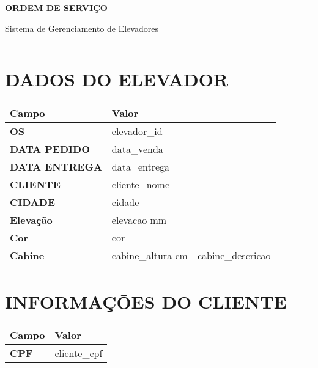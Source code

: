 \documentclass[a4paper,11pt]{article}
\begin{document}
\begin{center}
  {\Huge\textbf{ORDEM DE SERVIÇO}}
  
  \vspace{0.5cm}
  
  Sistema de Gerenciamento de Elevadores
\end{center}

\vspace{1cm}
\noindent\rule{\textwidth}{1pt}
\vspace{0.5cm}

\section*{DADOS DO ELEVADOR}

\begin{tabular}{|L{4cm}|L{8cm}|}
  \hline
  \textbf{Campo} & \textbf{Valor} \\
  \hline
  \textbf{OS} & {{elevador_id}} \\
  \hline
  \textbf{DATA PEDIDO} & {{data_venda}} \\
  \hline
  \textbf{DATA ENTREGA} & {{data_entrega}} \\
  \hline
  \textbf{CLIENTE} & {{cliente_nome}} \\
  \hline
  \textbf{CIDADE} & {{cidade}} \\
  \hline
  \textbf{Elevação} & {{elevacao}} mm \\
  \hline
  \textbf{Cor} & {{cor}} \\
  \hline
  \textbf{Cabine} & {{cabine_altura}} cm - {{cabine_descricao}} \\
  \hline
\end{tabular}

\vspace{0.5cm}

\section*{INFORMAÇÕES DO CLIENTE}

\begin{tabular}{|L{4cm}|L{8cm}|}
  \hline
  \textbf{Campo} & \textbf{Valor} \\
  \hline
  \textbf{CPF} & {{cliente_cpf}} \\
  \hline
\end{tabular}

\vspace{0.5cm}
\end{document}
